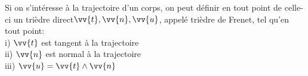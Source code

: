 ﻿\documentclass[a4paper]{article}
\begin{document}
\pagestyle{fancy}
\fancyhf{}
\setlength{\headheight}{15pt}

\begin{center}
	\large{}
\end{center}


Si on s'intéresse à la trajectoire d'un corps, on peut définir en tout point de celle-ci un trièdre direct\(\vv{t},\vv{n},\vv{u}\), appelé trièdre de Frenet, tel qu'en tout point:\\
i) \(\vv{t}\) est tangent à la trajectoire\\
ii) \(\vv{n}\) est normal à la trajectoire\\
iii) \(\vv{u}=\vv{t}\wedge\vv{n}\)\\
\end{document}
